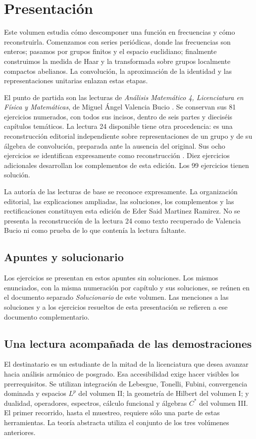 \chapter*{Presentación}
Este volumen estudia cómo descomponer una función en frecuencias y cómo reconstruirla. Comenzamos con series periódicas, donde las frecuencias son enteros; pasamos por grupos finitos y el espacio euclidiano; finalmente construimos la medida de Haar y la transformada sobre grupos localmente compactos abelianos. La convolución, la aproximación de la identidad y las representaciones unitarias enlazan estas etapas.

El punto de partida son las lecturas de \emph{Análisis Matemático 4, Licenciatura en Física y Matemáticas}, de Miguel Ángel Valencia Bucio \cite{valencia4}. Se conservan sus 81 ejercicios numerados, con todos sus incisos, dentro de seis partes y dieciséis capítulos temáticos. La lectura 24 disponible tiene otra procedencia: es una reconstrucción editorial independiente sobre representaciones de un grupo y de su álgebra de convolución, preparada ante la ausencia del original. Sus ocho ejercicios se identifican expresamente como reconstrucción \cite{reconstruccion24}. Diez ejercicios adicionales desarrollan los complementos de esta edición. Los 99 ejercicios tienen solución.

La autoría de las lecturas de base se reconoce expresamente. La organización editorial, las explicaciones ampliadas, las soluciones, los complementos y las rectificaciones constituyen esta edición de Eder Said Martinez Ramirez. No se presenta la reconstrucción de la lectura 24 como texto recuperado de Valencia Bucio ni como prueba de lo que contenía la lectura faltante.

\section*{Apuntes y solucionario}
Los ejercicios se presentan en estos apuntes sin soluciones. Los mismos
enunciados, con la misma numeración por capítulo y sus soluciones, se reúnen
en el documento separado \emph{Solucionario} de este volumen. Las menciones
a las soluciones y a los ejercicios resueltos de esta presentación se refieren
a ese documento complementario.

\section*{Una lectura acompañada de las demostraciones}
El destinatario es un estudiante de la mitad de la licenciatura que desea avanzar hacia análisis armónico de posgrado. Esa accesibilidad exige hacer visibles los prerrequisitos. Se utilizan integración de Lebesgue, Tonelli, Fubini, convergencia dominada y espacios $L^p$ del volumen II; la geometría de Hilbert del volumen I; y dualidad, operadores, espectros, cálculo funcional y álgebras $C^*$ del volumen III. El primer recorrido, hasta el muestreo, requiere sólo una parte de estas herramientas. La teoría abstracta utiliza el conjunto de los tres volúmenes anteriores.

